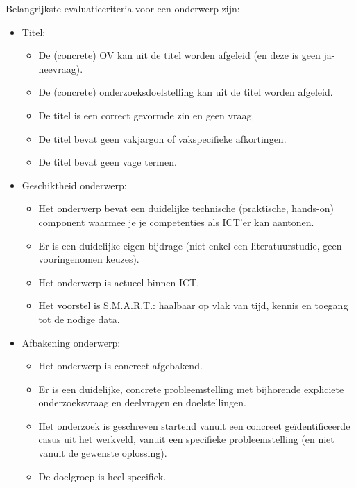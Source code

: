 
Belangrijkste evaluatiecriteria voor een onderwerp zijn:

\begin{itemize}
  \item Titel:
  \begin{itemize}
    \item De (concrete) OV kan uit de titel worden afgeleid (en deze is geen ja-neevraag).
    \item De (concrete) onderzoeksdoelstelling kan uit de titel worden afgeleid.
    \item De titel is een correct gevormde zin en geen vraag.
    \item De titel bevat geen vakjargon of vakspecifieke afkortingen.
    \item De titel bevat geen vage termen.
  \end{itemize}
  \item Geschiktheid onderwerp:
  \begin{itemize}
    \item Het onderwerp bevat een duidelijke technische (praktische, hands-on) component waarmee je je competenties als ICT'er kan aantonen. 
    \item Er is een duidelijke eigen bijdrage (niet enkel een literatuurstudie, geen vooringenomen keuzes). 
    \item Het onderwerp is actueel binnen ICT.
    \item Het voorstel is S.M.A.R.T.: haalbaar op vlak van tijd, kennis en toegang tot de nodige data.
  \end{itemize}
  \item Afbakening onderwerp:
  \begin{itemize}
    \item Het onderwerp is concreet afgebakend. 
    \item Er is een duidelijke, concrete probleemstelling met bijhorende expliciete onderzoeksvraag en deelvragen en doelstellingen.
    \item Het onderzoek is geschreven startend vanuit een concreet geïdentificeer\-de casus uit het werkveld, vanuit een specifieke probleemstelling (en niet vanuit de gewenste oplossing).
    \item De doelgroep is heel specifiek. 
  \end{itemize}
\end{itemize}

